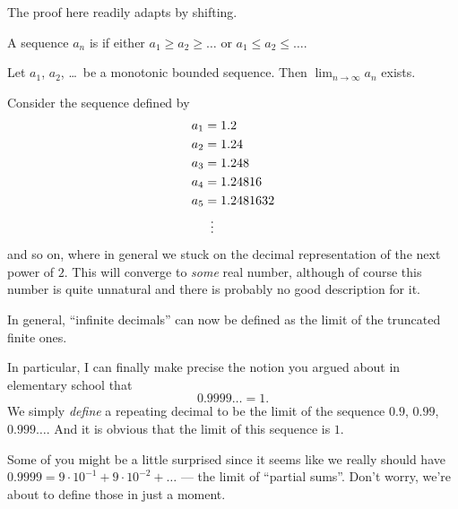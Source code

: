 The proof here readily adapts by shifting.
\begin{definition}
	A sequence $a_n$ is 
	if either $a_1 \ge a_2 \ge \dots$
	or $a_1 \le a_2 \le \dots$.
\end{definition}

\begin{theorem}
	Let $a_1$, $a_2$, \dots\ be a monotonic bounded sequence.
	Then $\lim_{n \to \infty} a_n$ exists.
	\label{thm:monotonic_bounded}
\end{theorem}

\begin{example}
	Consider the sequence defined by
	\begin{align*}
		a_1 &= 1.2 \\
		a_2 &= 1.24 \\
		a_3 &= 1.248 \\
		a_4 &= 1.24816 \\
		a_5 &= 1.2481632 \\
		&\vdotswithin=
	\end{align*}
	and so on, where in general we stuck
	on the decimal representation of the next power of $2$.
	This will converge to \emph{some} real number,
	although of course this number
	is quite unnatural and there is probably no good description for it.
\end{example}
In general, ``infinite decimals''
can now be defined as the limit of the truncated finite ones.

\begin{example}
	[$0.9999\dots = 1$]
	In particular, I can finally make precise the notion
	you argued about in elementary school that
	\[ 0.9999\dots = 1. \]
	We simply \emph{define} a repeating decimal
	to be the limit of the sequence $0.9$, $0.99$, $0.999\dots$.
	And it is obvious that the limit of this sequence is $1$.
\end{example}

Some of you might be a little surprised since
it seems like we really should have
$0.9999 = 9 \cdot 10^{-1} + 9 \cdot 10^{-2} + \dots$ ---
the limit of ``partial sums''.
Don't worry, we're about to define those in just a moment.

\medskip

